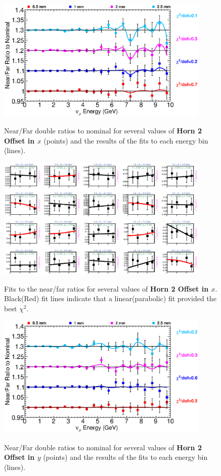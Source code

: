 \begin{figure}[ht]
  \begin{center}
    {\includegraphics[width=4.0in]{figures/Horn2XOffset_nof_summary.eps}}
  \end{center}
\caption{ Near/Far double ratios to nominal for several values of {\bf Horn 2 Offset in $x$} (points) and the results of the fits to each energy bin (lines).}
\end{figure}

\begin{figure}[hb]
  \begin{center}
    {\includegraphics[width=4.0in]{figures/Horn2XOffset_nof_fits.eps}}
  \end{center}
\caption{ Fits to the near/far ratios for several values of {\bf Horn 2 Offset in $x$}. Black(Red) fit lines indicate that a linear(parabolic) fit provided the best $\chi^2$. }
\end{figure}

\begin{figure}[ht]
  \begin{center}
    {\includegraphics[width=4.0in]{figures/Horn2YOffset_nof_summary.eps}}
  \end{center}
\caption{ Near/Far double ratios to nominal for several values of {\bf Horn 2 Offset in $y$} (points) and the results of the fits to each energy bin (lines).}
\end{figure}

